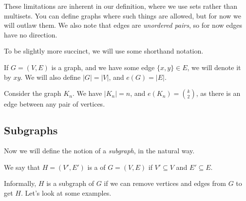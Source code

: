 \documentclass[a4paper]{scrreprt}
\begin{document}
\begin{remark}
\begin{center}

	\end{center}
	These limitations are inherent in our definition, where we use sets rather than multisets. You can define graphs where such things are allowed, but for now we will outlaw them. We also note that edges are \emph{unordered pairs}, so for now edges have no direction.
\end{remark}

To be slightly more succinct, we will use some shorthand notation. 

\begin{notation}
If $G = (V, E)$ is a graph, and we have some edge $\{x, y\} \in E$, we will denote it by $xy$. We will also define $|G| = |V|$, and $e(G) = |E|$.
\end{notation}
 
\begin{example}
	Consider the graph $K_n$. We have $|K_n| = n$, and $e(K_n) = \binom{k}{2}$, as there is an edge between any pair of vertices.
\end{example}

\subsection{Subgraphs}

Now we will define the notion of a \emph{subgraph}, in the natural way.

\begin{definition}[Subgraph]
	We say that $H= (V', E')$ is a  of $G = (V, E)$ if $V' \subseteq V$ and $E' \subseteq E$.
\end{definition}

Informally, $H$ is a subgraph of $G$ if we can remove vertices and edges from $G$ to get $H$. Let's look at some examples.
\end{document}
